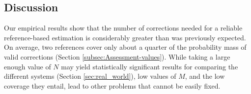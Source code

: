 \documentclass[letter,11pt]{article}
\newcommand{\oa}[1]{\footnote{\color{red}OA: #1}}
\begin{document}

		
\subsection{Discussion}


Our empirical results show that the number of corrections needed for a reliable reference-based estimation
is considerably greater than was previously expected. On average, two references
cover only about a quarter of the probability mass of valid corrections (Section \ref{subsec:Assessment-values}).
While taking a large enough value of $N$ may yield statistically significant results for comparing the
different systems (Section \ref{sec:real_world}), low values of $M$, and the low coverage they entail, lead to other problems
that cannot be easily fixed.

\end{document}
